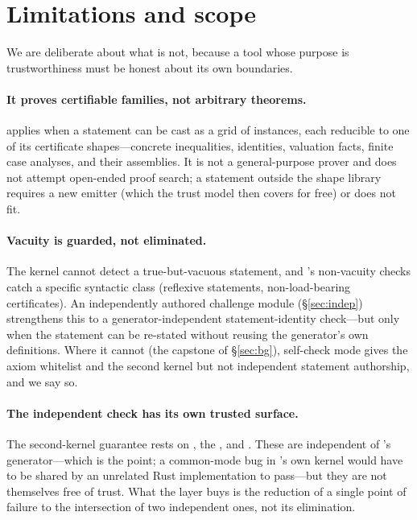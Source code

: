 \section{Limitations and scope}
\label{sec:limits}

We are deliberate about what \Telperion{} is not, because a tool whose purpose is
trustworthiness must be honest about its own boundaries.

\paragraph{It proves certifiable families, not arbitrary theorems.} \Telperion{}
applies when a statement can be cast as a grid of instances, each reducible to one
of its certificate shapes---concrete inequalities, identities, valuation facts,
finite case analyses, and their assemblies. It is not a general-purpose prover and
does not attempt open-ended proof search; a statement outside the shape library
requires a new emitter (which the trust model then covers for free) or does not fit.

\paragraph{Vacuity is guarded, not eliminated.} The kernel cannot detect a
true-but-vacuous statement, and \Telperion's non-vacuity checks catch a specific
syntactic class (reflexive statements, non-load-bearing certificates). An
independently authored challenge module (\S\ref{sec:indep}) strengthens this to a
generator-independent statement-identity check---but only when the statement can be
re-stated without reusing the generator's own definitions. Where it cannot (the
capstone of \S\ref{sec:bg}), self-check mode gives the axiom whitelist and the second
kernel but not independent statement authorship, and we say so.

\paragraph{The independent check has its own trusted surface.} The second-kernel
guarantee rests on , the \Comparator, and \nanoda. These are
independent of \Telperion's generator---which is the point; a common-mode bug in
\Lean's own kernel would have to be shared by an unrelated Rust implementation to
pass---but they are not themselves free of trust. What the layer buys is the
reduction of a single point of failure to the intersection of two independent ones,
not its elimination.

